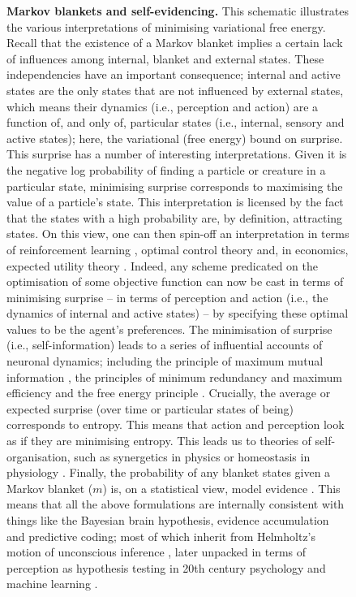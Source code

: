 \documentclass[review,12pt,authoryear]{elsarticle}
\begin{document}
\begin{figure}
\setcounter{figure}{2}
    \caption{\textbf{Markov blankets and self-evidencing.}
This schematic illustrates the various interpretations of minimising variational free energy. Recall that the existence of a Markov blanket implies a certain lack of influences among internal, blanket and external states. These independencies have an important consequence; internal and active states are the only states that are not influenced by external states, which means their dynamics (i.e., perception and action) are a function of, and only of, particular states (i.e., internal, sensory and active states); here, the variational (free energy) bound on surprise. This surprise has a number of interesting interpretations. Given it is the negative log probability of finding a particle or creature in a particular state, minimising surprise corresponds to maximising the value of a particle’s state. This interpretation is licensed by the fact that the states with a high probability are, by definition, attracting states. On this view, one can then spin-off an interpretation in terms of reinforcement learning \citep{bartoReinforcementLearningIntroduction1992}, optimal control theory \citep{todorovOptimalFeedbackControl2002} and, in economics, expected utility theory \citep{bossaertsBehaviouralEconomicsNeuroeconomics2015}. Indeed, any scheme predicated on the optimisation of some objective function can now be cast in terms of minimising surprise -- in terms of perception and action (i.e., the dynamics of internal and active states) -- by specifying these optimal values to be the agent's preferences. The minimisation of surprise (i.e., self-information) leads to a series of influential accounts of neuronal dynamics; including the principle of maximum mutual information \citep{opticanTemporalEncodingTwodimensional1987,linskerPerceptualNeuralOrganization1990}, the principles of minimum redundancy and maximum efficiency \citep{barlowPossiblePrinciplesUnderlying1961} and the free energy principle \citep{fristonFreeEnergyPrinciple2006}. Crucially, the average or expected surprise (over time or particular states of being) corresponds to entropy. This means that action and perception look as if they are minimising entropy. This leads us to theories of self-organisation, such as synergetics in physics \citep{hakenSynergeticsIntroductionNonequilibrium1978,kauffmanOriginsOrderSelforganization1993,nicolisSelforganizationNonequilibriumSystems1977} or homeostasis in physiology \citep{ashbyPrinciplesSelfOrganizingDynamic1947,bernardLecturesPhenomenaLife1974,conantEveryGoodRegulator1970}. Finally, the probability of any blanket states given a Markov blanket ($m$) is, on a statistical view, model evidence \citep{mackayInformationTheoryInference2003,mackayFreeEnergyMinimization1995}. This means that all the above formulations are internally consistent with things like the Bayesian brain hypothesis, evidence accumulation and predictive coding; most of which inherit from Helmholtz's motion of unconscious inference \citep{helmholtzHelmholtzTreatisePhysiological1962}, later unpacked in terms of perception as hypothesis testing in 20th century psychology \citep{gregoryPerceptionsHypotheses1980} and machine learning \citep{dayanHelmholtzMachine1995}.}

\end{figure}
\end{document}
